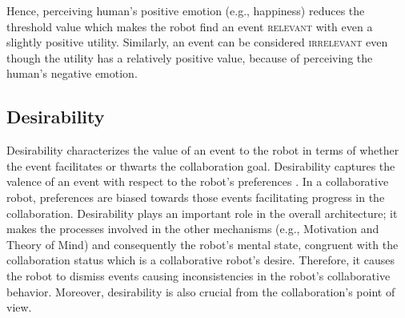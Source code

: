 \documentclass[12pt]{report}
\begin{document}
Hence, perceiving human's positive emotion (e.g., happiness) reduces the
threshold value which makes the robot find an event \textsc{relevant} with even
a slightly positive utility. Similarly, an event can be considered
\textsc{irrelevant} even though the utility has a relatively positive value,
because of perceiving the human's negative emotion.

\subsection{Desirability}
Desirability characterizes the value of an event to the robot in terms of
whether the event facilitates or thwarts the collaboration goal. Desirability
captures the valence of an event with respect to the robot's preferences
\cite{gratch:domain-independent}. In a collaborative robot, preferences are
biased towards those events facilitating progress in the collaboration.
Desirability plays an important role in the overall architecture; it makes the
processes involved in the other mechanisms (e.g., Motivation and Theory of
Mind) and consequently the robot's mental state, congruent with the
collaboration status which is a collaborative robot's desire. Therefore, it
causes the robot to dismiss events causing inconsistencies in the robot's
collaborative behavior. Moreover, desirability is also crucial from the
collaboration's point of view.

\end{document}
